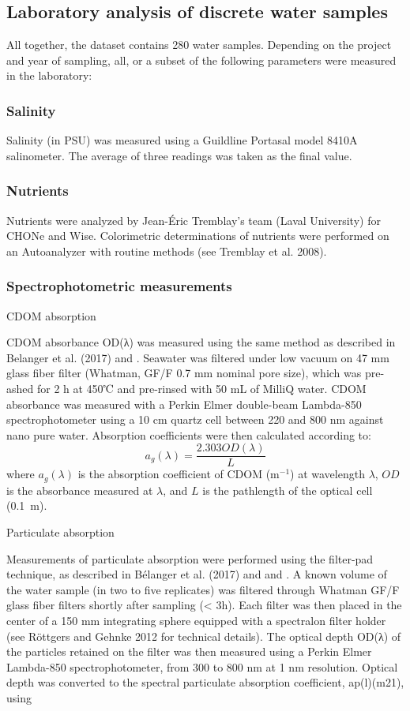 \documentclass[essd, manuscript]{copernicus}
\begin{document}
\subsection{Laboratory analysis of discrete water samples} \label{labo}
All together, the dataset contains 280 water samples. Depending on the project and year of sampling, all, or a subset of the following parameters were measured in the laboratory:

\subsubsection{Salinity}
Salinity (in PSU) was measured using a Guildline Portasal model 8410A salinometer. The average of three readings was taken as the final value.

\subsubsection{Nutrients}
Nutrients were analyzed by Jean-Éric Tremblay's team (Laval University) for CHONe and Wise. Colorimetric determinations of nutrients were performed on an Autoanalyzer with routine methods (see Tremblay et al. 2008).

\subsubsection{Spectrophotometric measurements}
CDOM absorption

CDOM absorbance OD(λ) was measured using the same method as described in Belanger et al. (2017) and \citep{Araujo2022}. Seawater was filtered under low vacuum on 47 mm glass fiber filter (Whatman, GF/F 0.7 mm nominal pore size), which was pre-ashed for 2 h at 450℃ and pre-rinsed with 50 mL of MilliQ water. CDOM absorbance was measured with a Perkin Elmer double-beam Lambda-850 spectrophotometer using a 10 cm quartz cell between 220 and 800 nm against nano pure water. Absorption coefficients were then calculated according to:
\begin{equation}
a_g(\lambda) = \frac{2.303 OD(\lambda)}{L}
\label{eq:ag}
\end{equation}
where $a_g(\lambda)$ is the absorption coefficient of CDOM (m$^{-1}$) at wavelength $\lambda$, $OD$ is the absorbance measured at $\lambda$, and $L$ is the pathlength of the optical cell (0.1~m).

Particulate absorption

Measurements of particulate absorption were performed using the filter-pad technique, as described in Bélanger et al. (2017) and and \citep{Araujo2022}. A known volume of the water sample (in two to five replicates) was filtered through Whatman GF/F glass fiber filters shortly after sampling (< 3h). Each filter was then placed in the center of a 150 mm integrating sphere equipped with a spectralon filter holder (see Röttgers and Gehnke 2012 for technical details). The optical depth OD(λ) of the particles retained on the filter was then measured using a Perkin Elmer Lambda-850 spectrophotometer, from 300 to 800 nm at 1 nm resolution. Optical depth was converted to the spectral particulate absorption coefficient, ap(l)(m21), using
\end{document}
